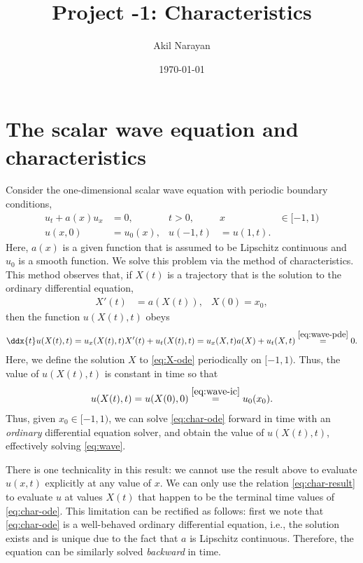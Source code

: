 \documentclass[11pt]{amsart}
\title{Project -1: Characteristics}
\author{Akil Narayan}
\date{\today}
\begin{document}
\maketitle

\section{The scalar wave equation and characteristics}
Consider the one-dimensional scalar wave equation with periodic boundary conditions,
\begin{subequations}\label{eq:wave}
  \begin{align}\label{eq:wave-pde}
    u_t + a(x) u_x &= 0, & t > 0, & x &\in [-1,1) \\\label{eq:wave-ic}
  u(x,0) &= u_0(x), & u(-1,t) &= u(1,t).
\end{align}
\end{subequations}
Here, $a(x)$ is a given function that is assumed to be Lipschitz continuous and $u_0$ is a smooth function. We solve this problem via the method of characteristics. This method observes that, if $X(t)$ is a trajectory that is the solution to the ordinary differential equation,
\begin{align}\label{eq:X-ode}
  X'(t) &= a(X(t)), & X(0) = x_0,
\end{align}
then the function $u(X(t), t)$ obeys
\begin{align}\label{eq:char-ode}
  \ddx{t} u(X(t),t) = u_x(X(t),t) X'(t) + u_t(X(t),t) = u_x(X,t) a(X) + u_t(X,t) \stackrel{\eqref{eq:wave-pde}}{=} 0.
\end{align}
Here, we define the solution $X$ to \eqref{eq:X-ode} periodically on $[-1,1)$. Thus, the value of $u(X(t),t)$ is constant in time so that
\begin{align}\label{eq:char-result}
  u(X(t),t) = u(X(0),0) \stackrel{\eqref{eq:wave-ic}}{=} u_0(x_0).
\end{align}
Thus, given $x_0 \in [-1,1)$, we can solve \eqref{eq:char-ode} forward in time with an \textit{ordinary} differential equation solver, and obtain the value of $u(X(t),t)$, effectively solving \eqref{eq:wave}. 

  There is one technicality in this result: we cannot use the result above to evaluate $u(x,t)$ explicitly at any value of $x$. We can only use the relation \eqref{eq:char-result} to evaluate $u$ at values $X(t)$ that happen to be the terminal time values of \eqref{eq:char-ode}. This limitation can be rectified as follows: first we note that \eqref{eq:char-ode} is a well-behaved ordinary differential equation, i.e., the solution exists and is unique due to the fact that $a$ is Lipschitz continuous. Therefore, the equation can be similarly solved \textit{backward} in time. 
\end{document}
